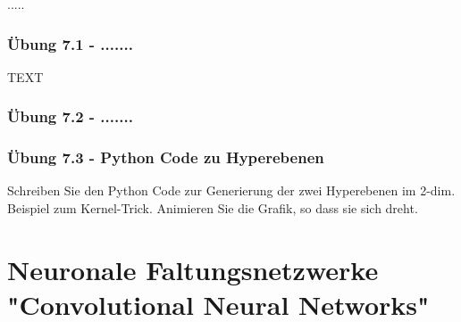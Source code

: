 \documentclass[12pt]{article}
\begin{document}
{\color{red}{*******************************************************************\\ 
ab hier bis Ende der Übungen sind die Folien der Vorlesung ML  zu nutzen und diese sind in Latex umzusetzen\\
********************************************************************\\}}
.....\\
\subsubsection{Übung 7.1 - .......}
TEXT\\
\subsubsection{Übung 7.2 - .......}

\subsubsection{Übung 7.3 - Python Code zu Hyperebenen}
Schreiben Sie den Python Code zur Generierung der zwei Hyperebenen im 2-dim. Beispiel zum Kernel-Trick. Animieren Sie die Grafik, so dass sie sich dreht. 

\newpage

\section{Neuronale Faltungsnetzwerke "Convolutional Neural Networks"}
\end{document}
